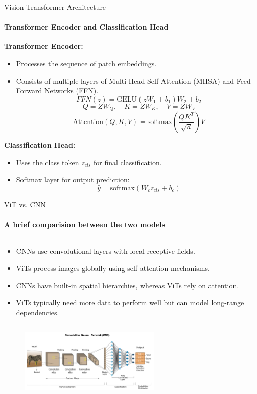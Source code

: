 \begin{frame}[fragile]{Vision Transformer Architecture}
  \framesubtitle{Transformer Encoder and Classification Head}
  \textbf{Transformer Encoder:}
  \begin{itemize}
    \item Processes the sequence of patch embeddings.
    \item Consists of multiple layers of Multi-Head Self-Attention (MHSA) and Feed-Forward Networks (FFN).
      \begin{equation}
        FFN(z) = \text{GELU} (zW_1 + b_1) W_2 + b_2
      \end{equation}
      \begin{equation}
        Q = Z W_Q, \quad K = Z W_K, \quad V = Z W_V
      \end{equation}
      \begin{equation}
        \text{Attention}(Q, K, V) = \text{softmax} \left( \frac{QK^T}{\sqrt{d}} \right) V
      \end{equation}
  \end{itemize}

  \textbf{Classification Head:}
  \begin{itemize}
    \item Uses the class token $ z_{cls} $ for final classification.
    \item Softmax layer for output prediction:
      \begin{equation}
        \hat{y} = \text{softmax} (W_c z_{cls} + b_c)
      \end{equation}
  \end{itemize}
\end{frame}

\begin{frame}[fragile]{ViT vs. CNN}
  \framesubtitle{A brief comparision between the two models}
  \begin{columns}
    \begin{column}{\textwidth}
      \begin{itemize}
        \item CNNs use convolutional layers with local receptive fields.
        \item ViTs process images globally using self-attention mechanisms.
        \item CNNs have built-in spatial hierarchies, whereas ViTs rely on attention.
        \item ViTs typically need more data to perform well but can model long-range dependencies.
      \end{itemize}
    \end{column}
  \end{columns}
  \begin{figure}
    \includegraphics[width=0.6\textwidth]{images/cnn_architecture.png}
  \end{figure}
\end{frame}